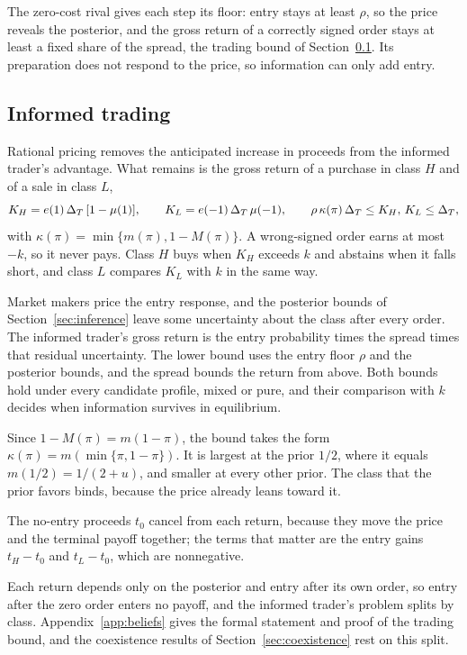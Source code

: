The zero-cost rival gives each step its floor: entry stays at least \(\rho\), so the price reveals the
posterior, and the gross return of a correctly signed order stays at least a fixed share of the spread, the
trading bound of Section~\ref{sec:informed}. Its preparation does not respond to the price, so information
can only add entry.

\subsection{Informed trading}\label{sec:informed}

Rational pricing removes the anticipated increase in proceeds from the informed trader's advantage. What remains is
the gross return of a purchase in class \(H\) and of a sale in class \(L\),
\[
K_H=e(1)\,\Delta_T\,[1-\mu(1)],\qquad K_L=e(-1)\,\Delta_T\,\mu(-1),\qquad \rho\,\kappa(\pi)\,\Delta_T\le K_H,\,K_L\le\Delta_T,
\]
with \(\kappa(\pi)=\min\{m(\pi),1-M(\pi)\}\). A wrong-signed order earns at most \(-k\), so it never pays.
Class \(H\) buys when \(K_H\) exceeds \(k\) and abstains when it falls short, and class \(L\) compares
\(K_L\) with \(k\) in the same way.

Market makers price the entry response, and the posterior bounds of Section~\ref{sec:inference} leave some
uncertainty about the class after every order. The informed trader's gross return is the entry probability
times the spread times that residual uncertainty. The lower bound uses the entry floor \(\rho\) and the
posterior bounds, and the spread bounds the return from above. Both bounds hold under every candidate profile, mixed or
pure, and their comparison with \(k\) decides when information survives in equilibrium.

Since \(1-M(\pi)=m(1-\pi)\), the bound takes the form \(\kappa(\pi)=m(\min\{\pi,1-\pi\})\). It is largest
at the prior \(1/2\), where it equals \(m(1/2)=1/(2+u)\), and smaller at every other prior. The class that
the prior favors binds, because the price already leans toward it.

The no-entry proceeds \(t_0\) cancel from each return, because they move the price and the terminal payoff
together; the terms that matter are the entry gains \(t_H-t_0\) and \(t_L-t_0\), which are nonnegative.

Each return depends only on the posterior and entry after its own order, so entry after the zero order
enters no payoff, and the informed trader's problem splits by class.
Appendix~\ref{app:beliefs} gives the formal statement and proof of the trading bound, and the coexistence results of
Section~\ref{sec:coexistence} rest on this split.

